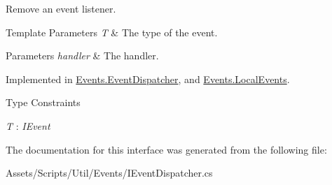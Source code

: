 Remove an event listener. 


\begin{DoxyTemplParams}{Template Parameters}
{\em T} & The type of the event.\\
\hline
\end{DoxyTemplParams}

\begin{DoxyParams}{Parameters}
{\em handler} & The handler.\\
\hline
\end{DoxyParams}


Implemented in \hyperlink{class_events_1_1_event_dispatcher_a88f24cbfab1022517830b3fc42155c15}{Events.\+Event\+Dispatcher}, and \hyperlink{class_events_1_1_local_events_ac8647cb9efdd5e6b86362908a8019cad}{Events.\+Local\+Events}.

\begin{Desc}
\item[Type Constraints]\begin{description}
\item[{\em T} : {\em I\+Event}]\end{description}
\end{Desc}


The documentation for this interface was generated from the following file\+:\begin{DoxyCompactItemize}
\item 
Assets/\+Scripts/\+Util/\+Events/I\+Event\+Dispatcher.\+cs\end{DoxyCompactItemize}
